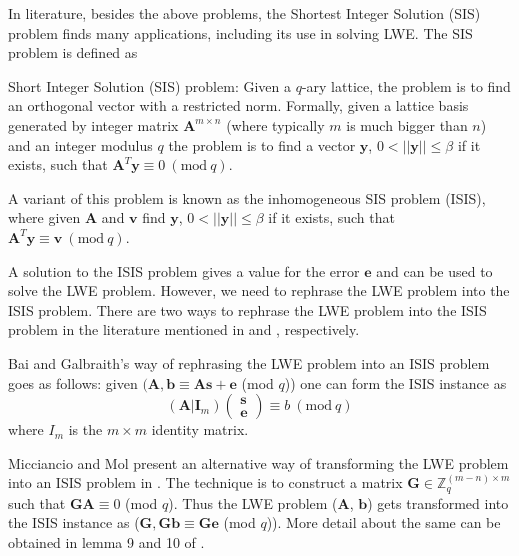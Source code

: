 In literature, besides the above problems, the Shortest Integer Solution (SIS) problem finds many applications, including its use in solving LWE.
The SIS problem is defined as

\begin{definition}Short Integer Solution (SIS) problem:
    Given a $q$-ary lattice, the problem is to find an orthogonal vector with a restricted norm.
    Formally, given a lattice basis generated by integer matrix $\pmb{A}^{m \times n}$ (where typically $m$ is much bigger than $n$) and an integer modulus $q$ the problem is to find a vector $\pmb{y}$, $0<||\pmb{y}||\leq \beta$ if it exists, such that $\pmb{A}^T\pmb{y} \equiv 0 \ ( \text{mod} \ q)$.

    A variant of this problem is known as the inhomogeneous SIS problem (ISIS), where given $\pmb{A}$ and $\pmb{v}$ find $\pmb{y}$,
    $0<||\pmb{y}||\leq \beta$ if it exists, such that $\pmb{A}^T\pmb{y} \equiv \pmb{v} \ ( \text{mod} \ q)$.
\end{definition}

A solution to the ISIS problem gives a value for the error $\pmb{e}$ and can be used to solve the LWE problem.
However, we need to rephrase the LWE problem into the ISIS problem.
There are two ways to rephrase the LWE problem into the ISIS problem in the literature mentioned in \cite{bai2014lattice} and \cite{micciancio2011pseudorandom}, respectively.

Bai and Galbraith’s \cite{bai2014lattice} way of rephrasing the LWE problem into an ISIS problem goes as follows: given $(\pmb{A}, \pmb{b} \equiv \pmb{As} + \pmb{e}$ (mod $q$)) one can form the ISIS instance as
\begin{equation*}
    (\pmb{A} | \pmb{I}_m)
    \begin{pmatrix}
        \pmb{s} \\
        \pmb{e}
    \end{pmatrix}
    \equiv b \ (\text{mod} \ q)
\end{equation*}
where $I_m$ is the $m \times m$ identity matrix.

Micciancio and Mol present an alternative way of transforming the LWE problem into an ISIS problem in \cite{micciancio2011pseudorandom}.
The technique is to construct a matrix $\pmb{G} \in \mathbb{Z}^{(m-n)\times m}_q$ such that $\pmb{GA} \equiv 0$ (mod $q$).
Thus the LWE problem ($\pmb{A}$, $\pmb{b}$) gets transformed into the ISIS instance as ($\pmb{G},\pmb{Gb}\equiv \pmb{Ge}$ (mod $q$)).
More detail about the same can be obtained in lemma 9 and 10 of \cite{micciancio2011pseudorandom}.


